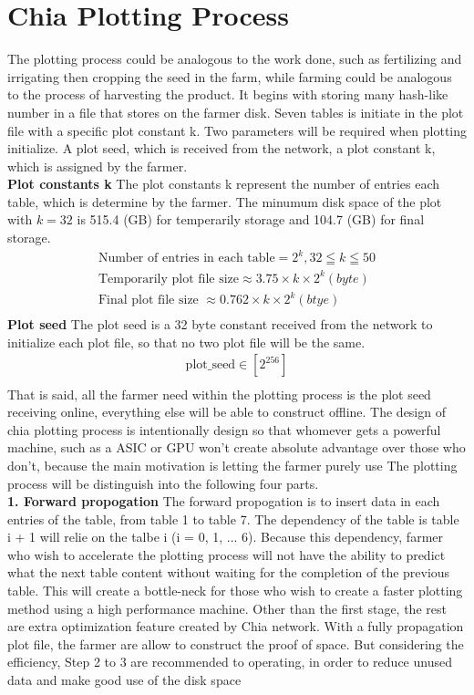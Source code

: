 \documentclass[sigconf, nonacm, natbib=false]{acmart}
\begin{document}
\section{Chia Plotting Process}
The plotting process could be analogous to the work done, such as fertilizing and irrigating then cropping the seed in the farm, while farming could be analogous to the process of harvesting the product. It begins with storing many hash-like number in a file that stores on the farmer disk. Seven tables is initiate in the plot file with a specific plot constant k. 
Two parameters will be required when plotting initialize. A plot seed, which is received from the network, a plot constant k, which is assigned by the farmer. \\
{\bf Plot constants k} The plot constants k represent the number of entries each table, which is determine by the farmer. The minumum disk space of the plot with $k = 32$ is 515.4 (GB) for temperarily storage and 104.7 (GB) for final storage. 
\begin{align*}
  \text{Number of entries in each table} = 2^{k}, 32 \leqq k \leqq 50 \\
  \text{Temporarily plot file size} \approx 3.75 \times k \times 2^{k} (byte) \\
  \text{Final plot file size } \approx 0.762 \times k \times 2^{k} (btye) \\
\end{align*}
{\bf Plot seed} The plot seed is a 32 byte constant received from the network to initialize each plot file, so that no two plot file will be the same. 
\begin{align*}
  \text{plot\_seed} \in [2^{256}] \\
\end{align*}
That is said, all the farmer need within the plotting process is the plot seed receiving online, everything else will be able to construct offline. The design of chia plotting process is intentionally design so that whomever gets a powerful machine, such as a ASIC or GPU won't create absolute advantage over those who don't, because the main motivation is letting the farmer purely use  The plotting process will be distinguish into the following four parts. \\
{\bf 1. Forward propogation}
The forward propogation is to insert data in each entries of the table, from table 1 to table 7. The dependency of the table is table i + 1 will relie on the talbe i (i = 0, 1, ... 6). Because this dependency, farmer who wish to accelerate the plotting process will not have the ability to predict what the next table content without waiting for the completion of the previous table. This will create a bottle-neck for those who wish to create a faster plotting method using a high performance machine. Other than the first stage, the rest are extra optimization feature created by Chia network. With a fully propagation plot file, the farmer are allow to construct the proof of space. But considering the efficiency, Step 2 to 3 are recommended to operating, in order to reduce unused data and make good use of the disk space\\
\end{document}
